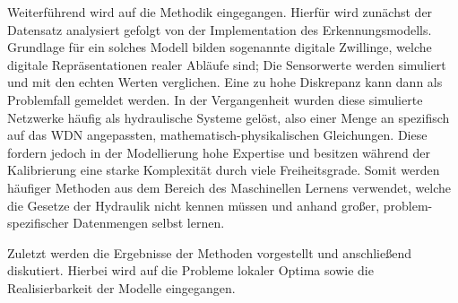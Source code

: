Weiterführend wird auf die Methodik eingegangen. Hierfür wird zunächst der Datensatz analysiert gefolgt von
 der Implementation des Erkennungsmodells. Grundlage für ein solches Modell bilden sogenannte digitale Zwillinge,
 welche digitale Repräsentationen realer Abläufe sind; Die Sensorwerte werden simuliert und mit den echten
 Werten verglichen. Eine zu hohe Diskrepanz kann dann als Problemfall gemeldet werden. In der Vergangenheit
 wurden diese simulierte Netzwerke häufig als hydraulische Systeme gelöst, also einer Menge an spezifisch auf
 das WDN angepassten, mathematisch-physikalischen Gleichungen. Diese fordern jedoch in der Modellierung hohe
 Expertise und besitzen während der Kalibrierung eine starke Komplexität durch viele Freiheitsgrade. Somit
 werden häufiger Methoden aus dem Bereich des Maschinellen Lernens verwendet, welche die Gesetze der Hydraulik
 nicht kennen müssen und anhand großer, problem-spezifischer Datenmengen selbst lernen.


Zuletzt werden die Ergebnisse der Methoden vorgestellt und anschließend diskutiert. Hierbei wird auf die
 Probleme lokaler Optima sowie die Realisierbarkeit der Modelle eingegangen.
